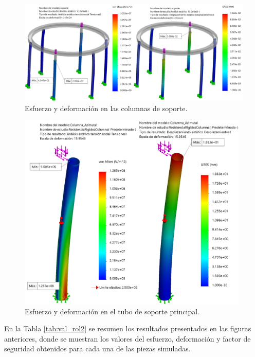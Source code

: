 \begin{figure}[H]
	\centering
	\includegraphics[width=\columnwidth]{imagenes/val_rol4}
	\caption{Esfuerzo y deformación en las columnas de soporte.}
	\label{fig:val_rol4}
\end{figure}
\begin{figure}[H]
	\centering
	\includegraphics[width=11cm]{imagenes/val_rol5}
	\caption{Esfuerzo y deformación en el tubo de soporte principal.}
	\label{fig:val_rol5}
\end{figure}

En la Tabla \ref{tab:val_rol2} se resumen los resultados presentados en las figuras anteriores, donde se muestran los valores del esfuerzo, deformación y factor de seguridad obtenidos para cada una de las piezas simuladas.

